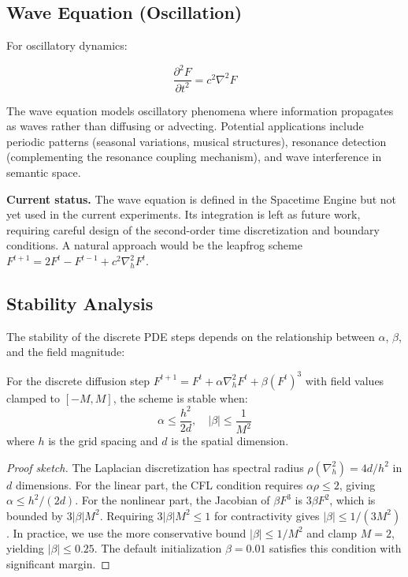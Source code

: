 \documentclass{article}
\begin{document}
\subsection{Wave Equation (Oscillation)}

For oscillatory dynamics:

\begin{equation}
\frac{\partial^2 F}{\partial t^2} = c^2 \nabla^2 F
\end{equation}

The wave equation models oscillatory phenomena where information propagates as waves rather than diffusing or advecting. Potential applications include periodic patterns (seasonal variations, musical structures), resonance detection (complementing the resonance coupling mechanism), and wave interference in semantic space.

\textbf{Current status.} The wave equation is defined in the Spacetime Engine but not yet used in the current experiments. Its integration is left as future work, requiring careful design of the second-order time discretization and boundary conditions. A natural approach would be the leapfrog scheme $F^{t+1} = 2F^t - F^{t-1} + c^2 \nabla^2_h F^t$.

\subsection{Stability Analysis}

The stability of the discrete PDE steps depends on the relationship between $\alpha$, $\beta$, and the field magnitude:

\begin{proposition}
For the discrete diffusion step $F^{t+1} = F^t + \alpha \nabla^2_h F^t + \beta (F^t)^3$ with field values clamped to $[-M, M]$, the scheme is stable when:
\begin{equation}
\alpha \leq \frac{h^2}{2d}, \quad |\beta| \leq \frac{1}{M^2}
\end{equation}
where $h$ is the grid spacing and $d$ is the spatial dimension.
\end{proposition}

\begin{proof}[Proof sketch]
The Laplacian discretization has spectral radius $\rho(\nabla^2_h) = 4d/h^2$ in $d$ dimensions. For the linear part, the CFL condition requires $\alpha \rho \leq 2$, giving $\alpha \leq h^2/(2d)$. For the nonlinear part, the Jacobian of $\beta F^3$ is $3\beta F^2$, which is bounded by $3|\beta| M^2$. Requiring $3|\beta| M^2 \leq 1$ for contractivity gives $|\beta| \leq 1/(3M^2)$. In practice, we use the more conservative bound $|\beta| \leq 1/M^2$ and clamp $M = 2$, yielding $|\beta| \leq 0.25$. The default initialization $\beta = 0.01$ satisfies this condition with significant margin.
\end{proof}
\end{document}
